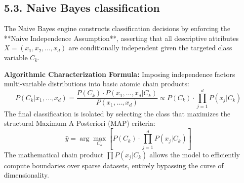 \documentclass[11pt,a4paper]{article}
\begin{document}
\subsection{5.3. Naive Bayes classification}
The Naive Bayes engine constructs classification decisions by enforcing the **Naive Independence Assumption**, asserting that all descriptive attributes $X = (x_1, x_2, ..., x_d)$ are conditionally independent given the targeted class variable $C_k$.

\textbf{Algorithmic Characterization Formula:} Imposing independence factors multi-variable distributions into basic atomic chain products:
\begin{equation}
    P(C_k | x_1, ..., x_d) = \frac{P(C_k) \cdot P(x_1, ..., x_d | C_k)}{P(x_1, ..., x_d)} \propto P(C_k) \cdot \prod_{j=1}^{d} P(x_j | C_k)
\end{equation}
The final classification is isolated by selecting the class that maximizes the structural Maximum A Posteriori (MAP) criteria:
\begin{equation}
    \hat{y} = \arg\max_{C_k} \left[ P(C_k) \cdot \prod_{j=1}^{d} P(x_j | C_k) \right]
\end{equation}
The mathematical chain product $\prod P(x_j | C_k)$ allows the model to efficiently compute boundaries over sparse datasets, entirely bypassing the curse of dimensionality.
\end{document}
